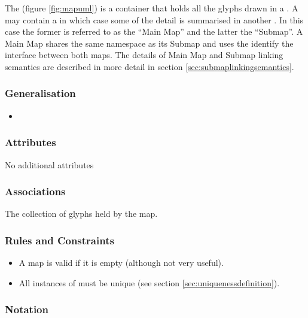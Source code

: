 The  (figure \ref{fig:mapuml}) is a container that
holds all the glyphs drawn in a \PDm. A  may contain a
 in which case some of the detail is summarised
in another \PDm. In this case the former is referred to as the ``Main
Map'' and the latter the ``Submap''. A Main Map shares the same
namespace as its Submap and uses the 
identify the interface between both maps. The details of Main Map and
Submap linking semantics are described in more detail in section
\ref{sec:submaplinkingsemantics}.


\subsubsection{Generalisation}

\begin{itemize}
\item {}
\end{itemize}

\subsubsection{Attributes}

No additional attributes

\subsubsection{Associations}

\begin{attributes}
 The collection of glyphs held by the map. 
\end{attributes}

\subsubsection{Rules and Constraints}

\begin{itemize}
\item A map is valid if it is empty (although not very useful).
\item All instances of  must be unique (see
  section \ref{sec:uniquenessdefinition}).
\end{itemize}

\subsubsection{Notation}

